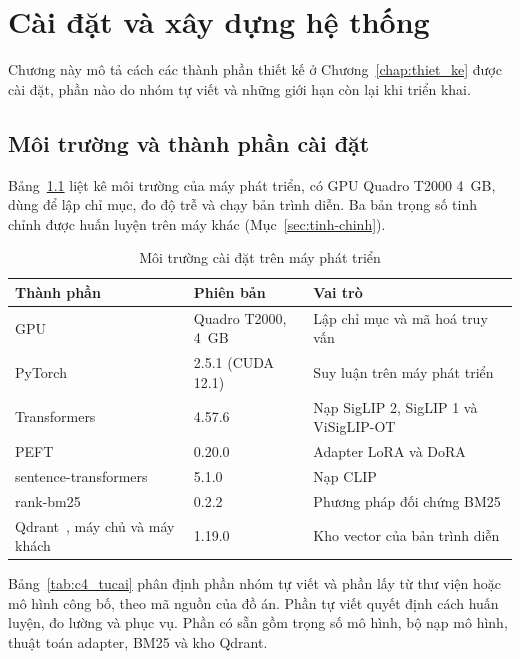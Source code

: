 \chapter{Cài đặt và xây dựng hệ thống}
\label{chap:cai_dat}

Chương này mô tả cách các thành phần thiết kế ở Chương~\ref{chap:thiet_ke} được cài đặt, phần nào do nhóm tự viết và những giới hạn còn lại khi triển khai.

\section{Môi trường và thành phần cài đặt}
\label{sec:moi-truong}

Bảng~\ref{tab:c4_moitruong} liệt kê môi trường của máy phát triển, có GPU Quadro T2000 4~GB, dùng để lập chỉ mục, đo độ trễ và chạy bản trình diễn. Ba bản trọng số tinh chỉnh được huấn luyện trên máy khác (Mục~\ref{sec:tinh-chinh}).

\begin{table}[H]
\centering
\caption{Môi trường cài đặt trên máy phát triển}
\label{tab:c4_moitruong}
\small
\renewcommand{\arraystretch}{1.1}
\begin{tabularx}{\textwidth}{@{}p{4.5cm} p{3.7cm} X@{}}
\toprule
\textbf{Thành phần} & \textbf{Phiên bản} & \textbf{Vai trò} \\
\midrule
GPU & Quadro T2000, 4~GB & Lập chỉ mục và mã hoá truy vấn \\
PyTorch & 2.5.1 (CUDA 12.1) & Suy luận trên máy phát triển \\
Transformers~\cite{wolf2020transformers} & 4.57.6 & Nạp SigLIP 2, SigLIP 1 và ViSigLIP-OT \\
PEFT~\cite{mangrulkar2022peft} & 0.20.0 & Adapter LoRA và DoRA \\
sentence-transformers~\cite{reimers2019sbert} & 5.1.0 & Nạp CLIP \\
rank-bm25~\cite{brown2020rankbm25} & 0.2.2 & Phương pháp đối chứng BM25 \\
Qdrant~\cite{qdrantdocs}, máy chủ và máy khách & 1.19.0 & Kho vector của bản trình diễn \\
\bottomrule
\end{tabularx}
\end{table}

Bảng~\ref{tab:c4_tucai} phân định phần nhóm tự viết và phần lấy từ thư viện hoặc mô hình công bố, theo mã nguồn của đồ án. Phần tự viết quyết định cách huấn luyện, đo lường và phục vụ. Phần có sẵn gồm trọng số mô hình, bộ nạp mô hình, thuật toán adapter, BM25 và kho Qdrant.


